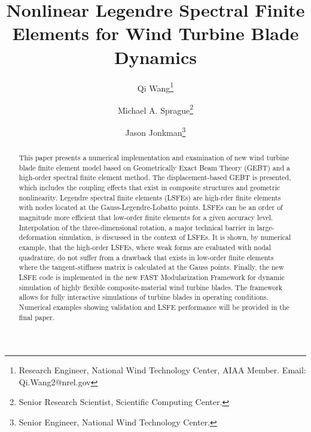 \documentclass{aiaa-tc}
\title{Nonlinear Legendre Spectral Finite Elements for Wind Turbine Blade Dynamics}
\author{Qi Wang\thanks{Research Engineer, National Wind Technology Center, AIAA Member. Email: Qi.Wang2@nrel.gov}}
\author{Michael A. Sprague\thanks{Senior Research Scientist, Scientific Computing Center.}}
\author{Jason Jonkman\thanks{Senior Engineer, National Wind Technology Center.}}
\affil{National Renewable Energy Laboratory, Golden, CO 80401}
\renewcommand{\kill}[1]{\textcolor{red}{\sout{#1}}}
\begin{document}
\maketitle

\begin{abstract}
This paper presents a numerical implementation and examination of new wind
turbine blade finite element model based on Geometrically Exact Beam Theory
(GEBT) and a high-order spectral finite element method.  The
displacement-based GEBT is presented, which includes the coupling effects
that exist in composite structures and geometric nonlinearity.   Legendre
spectral finite elements (LSFEs) are high-rder finite elements with nodes
located at the Gauss-Legendre-Lobatto points.  LSFEs can be an order of
magnitude more efficient that low-order finite elements for a given accuracy
level.  Interpolation of the three-dimensional rotation, a major technical
barrier in large-deformation simulation, is discussed in the context of
LSFEs.  It is shown, by numerical example, that the high-order LSFEs, where
weak forms are evaluated with nodal quadrature, do not suffer from a
drawback that exists in low-order finite elements where the
tangent-stiffness matrix is calculated at the Gauss points.  Finally, the
new LSFE code is implemented in the new FAST Modularization Framework for
dynamic simulation of highly flexible composite-material wind turbine
blades.  The framework allows for fully interactive simulations of turbine
blades in operating conditions.  Numerical examples showing validation and
LSFE performance will be provided in the final paper.
\end{abstract}


\end{document}
